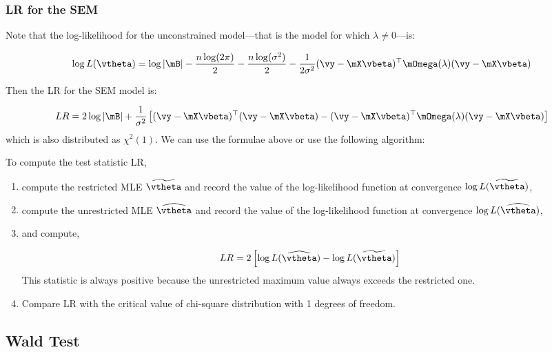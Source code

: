 \documentclass[english,12pt]{book}\usepackage[]{graphicx}\usepackage[]{xcolor}
\begin{document}
\subsubsection{LR for the SEM}

Note that the log-likelihood for the unconstrained model---that is the model for which $\lambda \neq  0$---is:

\begin{equation}\label{eq:lr_sem_un}
\log L(\vtheta) = \log\left| \mB\right| - \frac{n\log(2\pi)}{2} - \frac{n\log(\sigma^2)}{2} - \frac{1}{2\sigma^2}(\vy-\mX\vbeta)^\top\mOmega(\lambda)(\vy-\mX\vbeta) 
\end{equation}

Then the LR for the SEM model is:

\begin{equation}
  LR = 2\log \left|\mB\right| + \frac{1}{\sigma^2}\left[(\vy-\mX\vbeta)^\top (\vy-\mX\vbeta) - (\vy-\mX\vbeta)^\top\mOmega(\lambda)(\vy-\mX\vbeta)\right]
\end{equation}
%
which is also distributed as $\chi^2(1)$.
We can use the formulae above or use the following algorithm:

\begin{algorithm}[LR Test]
To compute the test statistic LR,

\begin{enumerate}
  \item compute the restricted MLE $\widetilde{\vtheta}$ and record the value of the log-likelihood function at convergence $\log L(\widetilde{\vtheta})$,
  \item compute the unrestricted MLE $\widehat{\vtheta}$ and record the value of the log-likelihood function at convergence $\log L(\widehat{\vtheta})$,
  \item and compute, 
  
  \begin{equation*}
    LR = 2\left[\log L(\widehat{\vtheta}) - \log L(\widetilde{\vtheta})\right]
  \end{equation*}
  This statistic is always positive because the unrestricted maximum value always exceeds the restricted one. 
  \item Compare LR with the critical value of chi-square distribution with 1 degrees of freedom. 
\end{enumerate}
\end{algorithm}


\subsection{Wald Test}
\end{document}
